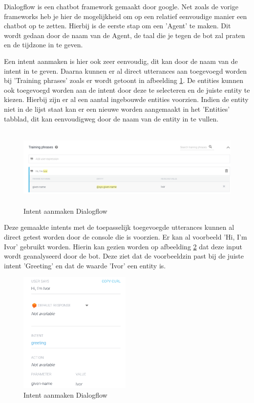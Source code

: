Dialogflow is een chatbot framework gemaakt door google. Net zoals de vorige frameworks heb je hier de mogelijkheid om op een relatief eenvoudige manier een chatbot op te zetten. Hierbij is de eerste stap om een 'Agent' te maken. Dit wordt gedaan door de naam van de Agent, de taal die je tegen de bot zal praten en de tijdzone in te geven.

Een intent aanmaken is hier ook zeer eenvoudig, dit kan door de naam van de intent in te geven. Daarna kunnen er al direct utterances aan toegevoegd worden bij 'Training phrases' zoals er wordt getoont in afbeelding \ref{fig:intentsdialogflow}. De entities kunnen ook toegevoegd worden aan de intent door deze te selecteren en de juiste entity te kiezen. Hierbij zijn er al een aantal ingebouwde entities voorzien. Indien de entity niet in de lijst staat kan er een nieuwe worden aangemaakt in het 'Entities' tabblad, dit kan eenvoudigweg door de naam van de entity in te vullen.

\begin{figure}[h!]
	\centering
	\includegraphics[height=4cm]{img/dialogflow_intents.png}
	\caption{Intent aanmaken Dialogflow}
	\label{fig:intentsdialogflow}
\end{figure}

Deze gemaakte intents met de toepasselijk toegevoegde utterances kunnen al direct getest worden door de console die is voorzien. Er kan al voorbeeld 'Hi, I'm Ivor' gebruikt worden. Hierin kan gezien worden op afbeelding \ref{fig:testdialogflow} dat deze input wordt geanalyseerd door de bot. Deze ziet dat de voorbeeldzin past bij de juiste intent 'Greeting' en dat de waarde 'Ivor' een entity is.

\begin{figure}[h!]
	\centering
	\includegraphics[height=6cm]{img/dia_test.png}
	\caption{Intent aanmaken Dialogflow}
	\label{fig:testdialogflow}
\end{figure}

